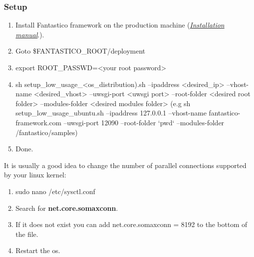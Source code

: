 \documentclass[letterpaper,10pt,english]{sphinxmanual}
\begin{document}
\subsubsection{Setup}
\label{how_to/deployment/low_usage_scenario:setup}\begin{enumerate}
\item {} 
Install Fantastico framework on the production machine ({\hyperref[get_started/installation::doc]{\emph{Installation manual}}}.).

\item {} 
Goto \$FANTASTICO\_ROOT/deployment

\item {} 
export ROOT\_PASSWD=\textless{}your root password\textgreater{}

\item {} 
sh setup\_low\_usage\_\textless{}os\_distribution).sh --ipaddress \textless{}desired\_ip\textgreater{} --vhost-name \textless{}desired\_vhost\textgreater{} --uwsgi-port \textless{}uwsgi port\textgreater{} --root-folder \textless{}desired root folder\textgreater{} --modules-folder \textless{}desired modules folder\textgreater{} (e.g sh setup\_low\_usage\_ubuntu.sh --ipaddress 127.0.0.1 --vhost-name fantastico-framework.com --uwsgi-port 12090 --root-folder {}`pwd{}` --modules-folder /fantastico/samples)

\item {} 
Done.

\end{enumerate}

It is usually a good idea to change the number of parallel connections supported by your linux kernel:
\begin{enumerate}
\item {} 
sudo nano /etc/sysctl.conf

\item {} 
Search for \textbf{net.core.somaxconn}.

\item {} 
If it does not exist you can add net.core.somaxconn = 8192 to the bottom of the file.

\item {} 
Restart the os.

\end{enumerate}
\end{document}
